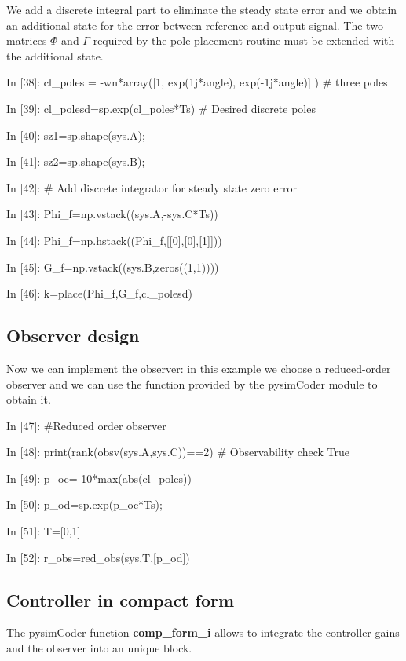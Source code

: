 We add a discrete integral part to eliminate the steady state error and we 
obtain an additional state for the error between reference and output signal. 
The two matrices $\Phi$ and $\Gamma$ required by the pole placement routine 
must be extended with the additional state.

\begin{code}

In [38]: cl_poles = -wn*array([1, exp(1j*angle), exp(-1j*angle)] ) # three poles

In [39]: cl_polesd=sp.exp(cl_poles*Ts)    # Desired discrete poles

In [40]: sz1=sp.shape(sys.A);

In [41]: sz2=sp.shape(sys.B);

In [42]: # Add discrete integrator for steady state zero error

In [43]: Phi_f=np.vstack((sys.A,-sys.C*Ts))

In [44]: Phi_f=np.hstack((Phi_f,[[0],[0],[1]]))

In [45]: G_f=np.vstack((sys.B,zeros((1,1))))

In [46]: k=place(Phi_f,G_f,cl_polesd)
\end{code}

\subsection{Observer design}

Now we can implement the observer: in this example we choose a reduced-order 
observer and we can use the function provided by the pysimCoder module to obtain
it.

\begin{code}
In [47]: #Reduced order observer

In [48]: print(rank(obsv(sys.A,sys.C))==2)     # Observability check
True

In [49]: p_oc=-10*max(abs(cl_poles))

In [50]: p_od=sp.exp(p_oc*Ts);

In [51]: T=[0,1]

In [52]: r_obs=red_obs(sys,T,[p_od])
\end{code}

\subsection{Controller in compact form}

The pysimCoder function \textbf{comp\_form\_i} allows to integrate the controller 
gains and the observer into an unique block.

